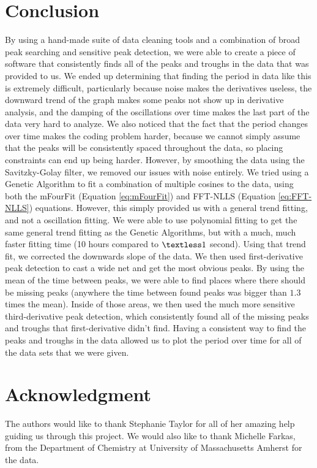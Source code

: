 \documentclass[conference]{IEEEtran}
\begin{document}
\section{Conclusion}
By using a hand-made suite of data cleaning tools and a combination of broad peak searching and sensitive peak detection, we were able to create a piece of software that consistently finds all of the peaks and troughs in the data that was provided to us. We ended up determining that finding the period in data like this is extremely difficult, particularly because noise makes the derivatives useless, the downward trend of the graph makes some peaks not show up in derivative analysis, and the damping of the oscillations over time makes the last part of the data very hard to analyze. We also noticed that the fact that the period changes over time makes the coding problem harder, because we cannot simply assume that the peaks will be consistently spaced throughout the data, so placing constraints can end up being harder.
However, by smoothing the data using the Savitzky-Golay filter, we removed our issues with noise entirely. We tried using a Genetic Algorithm to fit a combination of multiple cosines to the data, using both the mFourFit (Equation \ref{eq:mFourFit}) and FFT-NLLS (Equation \ref{eq:FFT-NLLS}) equations. However, this simply provided us with a general trend fitting, and not a oscillation fitting. We were able to use polynomial fitting to get the same general trend fitting as the Genetic Algorithms, but with a much, much faster fitting time (10 hours compared to $\textless 1$ second). Using that trend fit, we corrected the downwards slope of the data. We then used first-derivative peak detection to cast a wide net and get the most obvious peaks. By using the mean of the time between peaks, we were able to find places where there should be missing peaks (anywhere the time between found peaks was bigger than $1.3$ times the mean). Inside of those areas, we then used the much more sensitive third-derivative peak detection, which consistently found all of the missing peaks and troughs that first-derivative didn’t find. Having a consistent way to find the peaks and troughs in the data allowed us to plot the period over time for all of the data sets that we were given.

\section*{Acknowledgment}


The authors would like to thank Stephanie Taylor for all of her amazing help guiding us through this project. We would also like to thank Michelle Farkas, from the Department of Chemistry at University of Massachusetts Amherst for the data.
\end{document}

